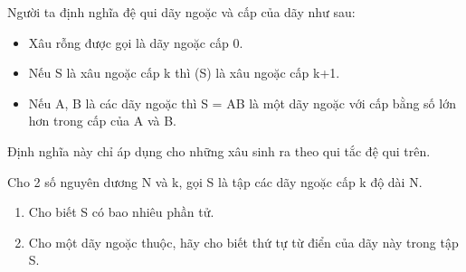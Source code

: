 Người ta định nghĩa đệ qui dãy ngoặc và cấp của dãy như sau:
\begin{itemize}
	\item Xâu rỗng được gọi là dãy ngoặc cấp 0.
	\item Nếu S là xâu ngoặc cấp k thì (S) là xâu ngoặc cấp k+1.
	\item Nếu A, B là các dãy ngoặc thì S = AB là một dãy ngoặc với cấp bằng số lớn hơn trong cấp của A và B.
\end{itemize}

Định nghĩa này chỉ áp dụng cho những xâu sinh ra theo qui tắc đệ qui trên.

Cho 2 số nguyên dương N và k, gọi S là tập các dãy ngoặc cấp k độ dài N.
\begin{enumerate}
	\item Cho biết S có bao nhiêu phần tử.
	\item Cho một dãy ngoặc thuộc, hãy cho biết thứ tự từ điển của dãy này trong tập S.
\end{enumerate}